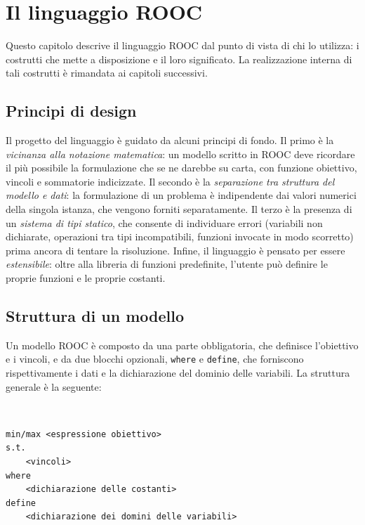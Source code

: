 
\chapter{Il linguaggio ROOC}
\label{cap:linguaggio}

Questo capitolo descrive il linguaggio ROOC dal punto di vista di chi lo
utilizza: i costrutti che mette a disposizione e il loro significato. La
realizzazione interna di tali costrutti è rimandata ai capitoli successivi.

\section{Principi di design}
\label{sec:design-linguaggio}

Il progetto del linguaggio è guidato da alcuni principi di fondo. Il primo è la
\emph{vicinanza alla notazione matematica}: un modello scritto in ROOC deve
ricordare il più possibile la formulazione che se ne darebbe su carta, con
funzione obiettivo, vincoli e sommatorie indicizzate. Il secondo è la
\emph{separazione tra struttura del modello e dati}: la formulazione di un
problema è indipendente dai valori numerici della singola istanza, che vengono
forniti separatamente. Il terzo è la presenza di un \emph{sistema di tipi
statico}, che consente di individuare errori (variabili non dichiarate,
operazioni tra tipi incompatibili, funzioni invocate in modo scorretto) prima
ancora di tentare la risoluzione. Infine, il linguaggio è pensato per essere
\emph{estensibile}: oltre alla libreria di funzioni predefinite, l'utente può
definire le proprie funzioni e le proprie costanti.

\section{Struttura di un modello}
\label{sec:struttura-modello}

Un modello ROOC è composto da una parte obbligatoria, che definisce l'obiettivo
e i vincoli, e da due blocchi opzionali, \texttt{where} e \texttt{define}, che
forniscono rispettivamente i dati e la dichiarazione del dominio delle variabili.
La struttura generale è la seguente:

\

\begin{lstlisting}[caption={Struttura generale di un modello ROOC.}, label={lst:struttura}]
min/max <espressione obiettivo>
s.t.
    <vincoli>
where
    <dichiarazione delle costanti>
define
    <dichiarazione dei domini delle variabili>
\end{lstlisting}

